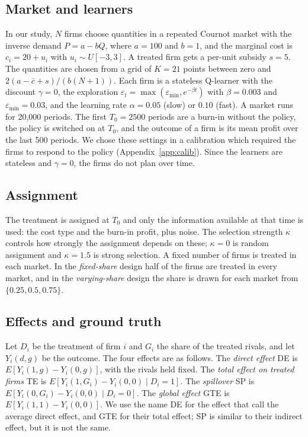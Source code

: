 \documentclass[11pt]{article}
\begin{document}
\subsection{Market and learners}
In our study, $N$ firms choose quantities in a repeated Cournot market with the inverse demand $P=a-bQ$, where $a=100$ and $b=1$, and the marginal cost is $c_i=20+u_i$ with $u_i\sim U[-3,3]$. A treated firm gets a per-unit subsidy $s=5$. The quantities are chosen from a grid of $K=21$ points between zero and $2(a-\bar c+s)/(b(N+1))$. Each firm is a stateless Q-learner with the discount $\gamma=0$, the exploration $\varepsilon_t=\max(\varepsilon_{\min},e^{-\beta t})$ with $\beta=0.003$ and $\varepsilon_{\min}=0.03$, and the learning rate $\alpha=0.05$ (slow) or $0.10$ (fast). A market runs for 20{,}000 periods. The first $T_0=2500$ periods are a burn-in without the policy, the policy is switched on at $T_0$, and the outcome of a firm is its mean profit over the last 500 periods. We chose these settings in a calibration which required the firms to respond to the policy (Appendix~\ref{app:calib}). Since the learners are stateless and $\gamma=0$, the firms do not plan over time.

\subsection{Assignment}
The treatment is assigned at $T_0$ and only the information available at that time is used: the cost type and the burn-in profit, plus noise. The selection strength $\kappa$ controls how strongly the assignment depends on these; $\kappa=0$ is random assignment and $\kappa=1.5$ is strong selection. A fixed number of firms is treated in each market. In the \emph{fixed-share} design half of the firms are treated in every market, and in the \emph{varying-share} design the share is drawn for each market from $\{0.25,0.5,0.75\}$.

\subsection{Effects and ground truth}
Let $D_i$ be the treatment of firm $i$ and $G_i$ the share of the treated rivals, and let $Y_i(d,g)$ be the outcome. The four effects are as follows. The \emph{direct effect} DE is $E[Y_i(1,g)-Y_i(0,g)]$, with the rivals held fixed. The \emph{total effect on treated firms} TE is $E[Y_i(1,G_i)-Y_i(0,0)\mid D_i=1]$. The \emph{spillover} SP is $E[Y_i(0,G_i)-Y_i(0,0)\mid D_i=0]$. The \emph{global effect} GTE is $E[Y_i(1,1)-Y_i(0,0)]$. We use the name DE for the effect that \citet{mkw2025} call the average direct effect, and GTE for their total effect; SP is similar to their indirect effect, but it is not the same.
\end{document}
